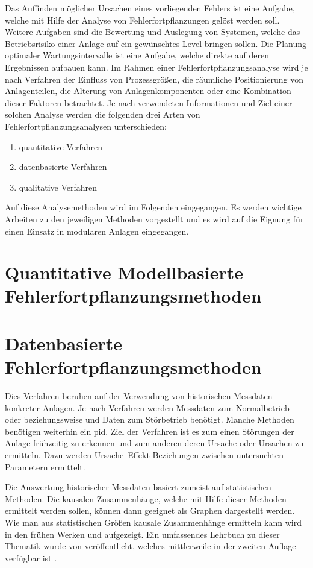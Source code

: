 Das Auffinden m\"oglicher Ursachen eines vorliegenden Fehlers ist eine Aufgabe, welche mit Hilfe der Analyse von Fehlerfortpflanzungen gel\"ost werden soll. Weitere Aufgaben sind die Bewertung und Auslegung von Systemen, welche das Betriebsrisiko einer Anlage auf ein gew\"unschtes Level bringen sollen. Die Planung optimaler Wartungsintervalle ist eine Aufgabe, welche direkte auf deren Ergebnissen aufbauen kann. \linebreak
Im Rahmen einer Fehlerfortpflanzungsanalyse wird je nach Verfahren der Einfluss von Prozessgr\"o\ss{}en, die r\"aumliche Positionierung von Anlagenteilen, die Alterung von Anlagenkomponenten oder eine Kombination dieser Faktoren betrachtet. Je nach verwendeten Informationen und Ziel einer solchen Analyse werden die folgenden drei Arten von Fehlerfortpflanzungsanalysen unterschieden:
\begin{enumerate}
\item quantitative Verfahren
\item datenbasierte Verfahren
\item qualitative Verfahren
\end{enumerate}\cite{Zhang_2017}

Auf diese Analysemethoden wird im Folgenden eingegangen. Es werden wichtige Arbeiten zu den jeweiligen Methoden vorgestellt und es wird auf die Eignung f\"ur einen Einsatz in modularen Anlagen eingegangen.

\section{Quantitative Modellbasierte Fehlerfortpflanzungsmethoden}
\section{Datenbasierte Fehlerfortpflanzungsmethoden}
Dies Verfahren beruhen auf der Verwendung von historischen Messdaten konkreter Anlagen. Je nach Verfahren werden Messdaten zum Normalbetrieb oder beziehungsweise und Daten zum St\"orbetrieb ben\"otigt. Manche Methoden ben\"otigen weiterhin ein \ac{pid}. Ziel der Verfahren ist es zum einen St\"orungen der Anlage fr\"uhzeitig zu erkennen und zum anderen deren Ursache oder Ursachen zu ermitteln. Dazu werden Ursache--Effekt Beziehungen zwischen untersuchten Parametern ermittelt.  

Die Auswertung historischer Messdaten basiert zumeist auf statistischen Methoden. Die kausalen Zusammenh\"ange, welche mit Hilfe dieser Methoden ermittelt werden sollen, k\"onnen dann geeignet als Graphen dargestellt werden. Wie man aus statistischen Gr\"o\ss{}en kausale Zusammenh\"ange ermitteln kann wird in den fr\"uhen Werken \textcite{Holland_1986} und  \textcite{Pearl_1995} aufgezeigt. Ein umfassendes Lehrbuch zu dieser Thematik wurde von \citeauthor{Pearl_2009} ver\"offentlicht, welches mittlerweile in der zweiten Auflage verf\"ugbar ist \cite{Pearl_2009}. 
